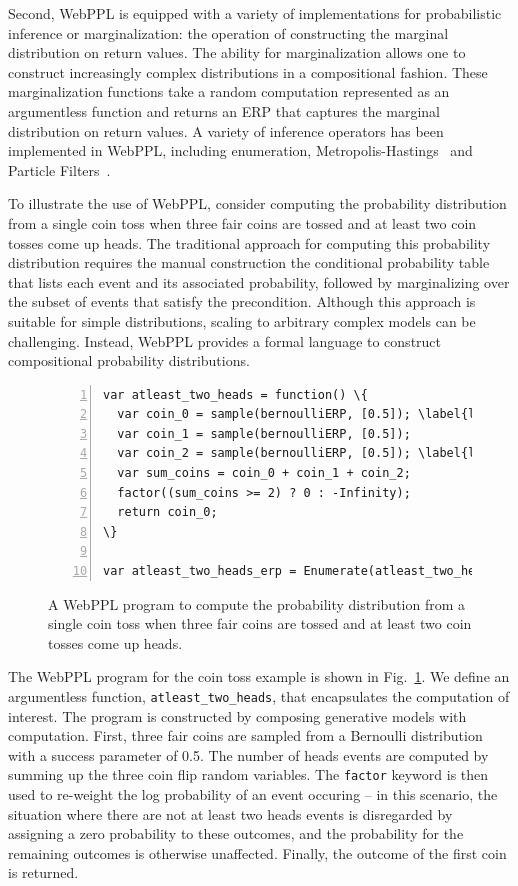 \documentclass[11pt]{article}
\begin{document}
Second, WebPPL is equipped with a variety of implementations for probabilistic inference or marginalization: the operation of constructing the marginal distribution on return values. The ability for marginalization allows one to construct increasingly complex distributions in a compositional fashion. These marginalization functions take a random computation represented as an argumentless function and returns an ERP that captures the marginal distribution on return values. A variety of inference operators has been implemented in WebPPL, including enumeration, Metropolis-Hastings~\cite{metropolis53:jcp, hastings70:bio} and Particle Filters~\cite{gordon93:rsp, liu98:jasm}. 

To illustrate the use of WebPPL, consider computing the probability distribution from a single coin toss when three fair coins are tossed and at least two coin tosses come up heads. The traditional approach for computing this probability distribution requires the manual construction the conditional probability table that lists each event and its associated probability, followed by marginalizing over the subset of events that satisfy the precondition. Although this approach is suitable for simple distributions, scaling to arbitrary complex models can be challenging. Instead, WebPPL provides a formal language to construct compositional probability distributions.

\begin{figure}[h]
\begin{Verbatim}[numbers=left,numbersep=1pt,frame=single,commandchars=\\\{\},fontfamily=courier,fontsize=\scriptsize]
var atleast_two_heads = function() \{
  var coin_0 = sample(bernoulliERP, [0.5]); \label{ln:webppl_ex_coin0}
  var coin_1 = sample(bernoulliERP, [0.5]);
  var coin_2 = sample(bernoulliERP, [0.5]); \label{ln:webppl_ex_coin2}
  var sum_coins = coin_0 + coin_1 + coin_2;
  factor((sum_coins >= 2) ? 0 : -Infinity);
  return coin_0;
\}

var atleast_two_heads_erp = Enumerate(atleast_two_heads)
\end{Verbatim}
\centering
\caption{A WebPPL program to compute the probability distribution from a single coin toss when three fair coins are tossed and at least two coin tosses come up heads.}
\label{fig:webppl_intro}
\end{figure}

The WebPPL program for the coin toss example is shown in Fig.~\ref{fig:webppl_intro}. We define an argumentless function, \texttt{atleast\_two\_heads}, that encapsulates the computation of interest. The program is constructed by composing generative models with computation. First, three fair coins are sampled from a Bernoulli distribution with a success parameter of 0.5. The number of heads events are computed by summing up the three coin flip random variables. The \texttt{factor} keyword is then used to re-weight the log probability of an event occuring -- in this scenario, the situation where there are not at least two heads events is disregarded by assigning a zero probability to these outcomes, and the probability for the remaining outcomes is otherwise unaffected. Finally, the outcome of the first coin is returned. 
\end{document}
